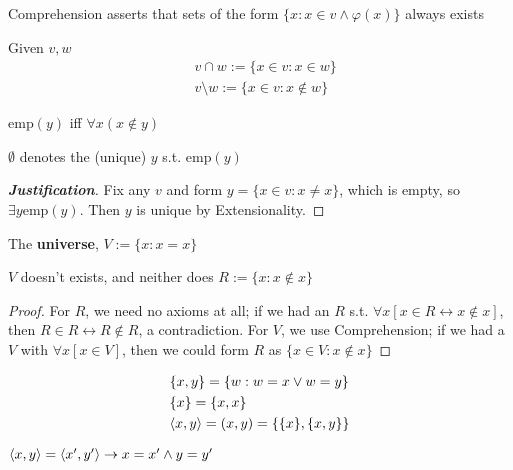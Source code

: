 \documentclass[11pt]{article}
\def \emp {\text{emp}}
\begin{document}
Comprehension asserts that sets of the form \(\{x:x\in v\wedge\varphi(x)\}\) always exists

\begin{definition}[]
Given \(v,w\)
\begin{align*}
&v\cap w:=\{x\in v:x\in w\}\\
&v\setminus w:=\{x\in v:x\not\in w\}
\end{align*}
\end{definition}

\begin{definition}[]
\(\emp(y)\) iff \(\forall x(x\not\in y)\)
\end{definition}

\begin{definition}[]
\(\emptyset\) denotes the (unique) \(y\) s.t. \(\emp(y)\)
\end{definition}

\begin{proof}[\textbf{Justification}]
Fix any \(v\) and form \(y=\{x\in v:x\neq x\}\), which is empty, so \(\exists y\emp(y)\). Then \(y\) is unique
by Extensionality.
\end{proof}

\begin{definition}[]
The \textbf{universe}, \(V:=\{x:x=x\}\)
\end{definition}

\begin{lemma}[]
\(V\) doesn't exists, and neither does \(R:=\{x:x\not\in x\}\)
\end{lemma}

\begin{proof}
For \(R\), we need no axioms at all; if we had an \(R\) s.t. \(\forall x[x\in R\leftrightarrow x\not\in x]\),
then \(R\in R\leftrightarrow R\not\in R\), a contradiction. For \(V\), we use Comprehension; if we had a \(V\)
with \(\forall x[x\in V]\), then we could form \(R\) as \(\{x\in V:x\not\in x\}\)
\end{proof}

\begin{definition}[]
\begin{align*}
&\{x,y\}=\{w:w=x\vee w=y\}\\
&\{x\}=\{x,x\}\\
&\langle x,y\rangle=(x,y)=\{\{x\},\{x,y\}\}
\end{align*}
\end{definition}

\begin{lemma}[]
\(\langle x,y\rangle=\langle x',y'\rangle\to x=x'\wedge y=y'\)
\end{lemma}
\end{document}
